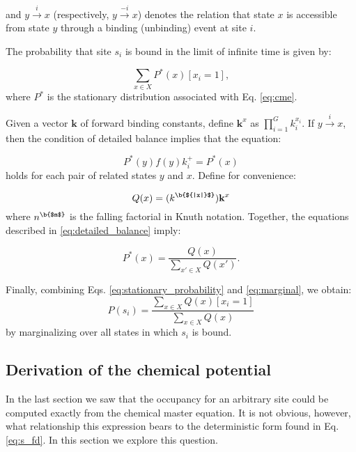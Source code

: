 \documentclass{article}
\begin{document}
and $y \overset{i}{\rightarrow} x$ (respectively, $y
\overset{-i}{\rightarrow} x$) denotes the relation that state $x$
is accessible from state $y$ through a binding (unbinding) event at
site $i$.  

The probability that site $s_i$ is bound in the limit
of infinite time is given by:

\begin{equation}
\label{eq:marginal}
 \sum_{x\in X}P^*(x)[x_i = 1],
\end{equation}
where $P^*$ is the stationary distribution associated with Eq. \ref{eq:cme}.  

Given a vector $\mathbf{k}$ of forward binding constants, define
$\mathbf{k}^x$ as $\prod_{i=1}^Gk_i^{x_i}$.  If
$y\overset{i}\rightarrow x$, then the condition of detailed balance
implies that the equation:

\begin{equation}
\label{eq:detailed_balance}
P^*(y) f(y)k^+_i = P^*(x)
\end{equation}
holds for each pair of related states $y$ and $x$.  Define for convenience:

\begin{equation}
  \label{eq:q}
  Q(x) = (k^{\b{${|x|}$}})\mathbf{k}^x
\end{equation}
where $n^{\b{$m$}}$ is the falling factorial in Knuth notation.
Together, the equations described in \ref{eq:detailed_balance} imply:

\begin{equation}
  \label{eq:stationary_probability}
  P^*(x)=\frac{Q(x)}{\sum_{x'\in X}Q(x')}.
\end{equation}

Finally, combining Eqs. \ref{eq:stationary_probability}
and \ref{eq:marginal}, we obtain:
\begin{equation}
  \label{eq:stochastic_occupancy}
  P(s_i) = \frac{\sum_{x\in X}Q(x)[x_i = 1]}{\sum_{x\in X}Q(x)}
\end{equation}
by marginalizing over all states in which $s_i$ is bound.

\subsection{Derivation of the chemical potential}

In the last section we saw that the occupancy for an arbitrary site
could be computed exactly from the chemical master equation.  It is
not obvious, however, what relationship this expression bears to the
deterministic form found in Eq. \ref{eq:s_fd}.  In this section we
explore this question.
\end{document}
